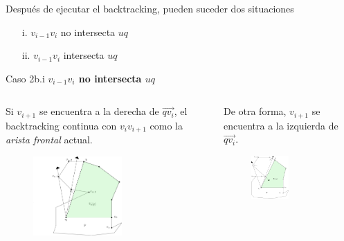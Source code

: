 \documentclass[aspectratio=169,xcolor=dvipsnames, t]{beamer}
\begin{document}
\begin{frame}[c]
    Después de ejecutar el backtracking, pueden suceder dos situaciones
    \begin{center}
        \begin{enumerate}
            \item [i.] $v_{i-1}v_{i}$ no intersecta $uq$
            \item [ii.] $v_{i-1}v_{i}$ intersecta $uq$
        \end{enumerate}
    \end{center}
\end{frame}

\begin{frame}{Caso 2b.i}
    \textbf{$v_{i-1}v_{i}$ no intersecta $uq$}\\ 
    \begin{columns}
    \begin{column}{0.45\textwidth}
    Si $v_{i+1}$ se encuentra a la derecha de $\overrightarrow{qv_{i}}$, el backtracking continua con $v_{i}v_{i+1}$ como la \textit{arista frontal} actual.
        \begin{figure}
            \centering
            \includegraphics[width=0.6\textwidth]{imagenes/Caso2.5b.png}
        \end{figure}
    \end{column}
    \begin{column}{0.45\textwidth}  %
        De otra forma, $v_{i+1}$ se encuentra a la izquierda de $\overrightarrow{qv_{i}}.$
        \begin{figure}
            \centering
            \includegraphics[width=0.5\textwidth]{imagenes/Caso2.6a.png}

\end{figure}
\end{column}
\end{columns}
\end{frame}
\end{document}
